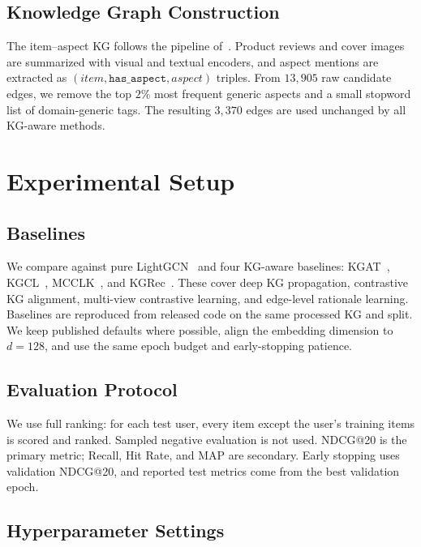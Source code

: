 \subsection{Knowledge Graph Construction}
\label{sec:eval-dataset-kg}

The item--aspect KG follows the pipeline of~\cite{ho2024reviewkg}. Product reviews and cover images are summarized with visual and textual encoders, and aspect mentions are extracted as $(\textit{item}, \texttt{has\_aspect}, \textit{aspect})$ triples. From $13{,}905$ raw candidate edges, we remove the top $2\%$ most frequent generic aspects and a small stopword list of domain-generic tags. The resulting $3{,}370$ edges are used unchanged by all KG-aware methods.

\section{Experimental Setup}
\label{sec:eval-setup}

\subsection{Baselines}
\label{sec:eval-baselines}

We compare against pure LightGCN~\cite{he2020lightgcn} and four KG-aware baselines: KGAT~\cite{wang2019kgat}, KGCL~\cite{yang2022kgcl}, MCCLK~\cite{zou2022mcclk}, and KGRec~\cite{yang2023kgrec}. These cover deep KG propagation, contrastive KG alignment, multi-view contrastive learning, and edge-level rationale learning. Baselines are reproduced from released code on the same processed KG and split. We keep published defaults where possible, align the embedding dimension to $d=128$, and use the same epoch budget and early-stopping patience.

\subsection{Evaluation Protocol}
\label{sec:eval-protocol}

We use full ranking: for each test user, every item except the user's training items is scored and ranked. Sampled negative evaluation is not used. NDCG@20 is the primary metric; Recall, Hit Rate, and MAP are secondary. Early stopping uses validation NDCG@20, and reported test metrics come from the best validation epoch.

\subsection{Hyperparameter Settings}
\label{sec:eval-hparams}

